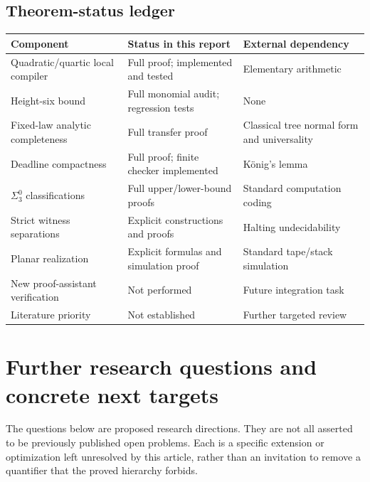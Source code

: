 \documentclass[11pt,letterpaper]{article}
\theoremstyle{definition}
\theoremstyle{remark}
\newcommand{\1}{\mathbf 1}
\begin{document}
\subsection{Theorem-status ledger}
\begin{center}
\begin{tabularx}{\textwidth}{@{}p{}XX@{}}
\toprule
Component & Status in this report & External dependency\\
\midrule
Quadratic/quartic local compiler & Full proof; implemented and tested & Elementary arithmetic\\
Height-six bound & Full monomial audit; regression tests & None\\
Fixed-law analytic completeness & Full transfer proof & Classical tree normal form and universality\\
Deadline compactness & Full proof; finite checker implemented & K\"onig's lemma\\
$\Sigma^0_3$ classifications & Full upper/lower-bound proofs & Standard computation coding\\
Strict witness separations & Explicit constructions and proofs & Halting undecidability\\
Planar realization & Explicit formulas and simulation proof & Standard tape/stack simulation\\
New proof-assistant verification & Not performed & Future integration task\\
Literature priority & Not established & Further targeted review\\
\bottomrule
\end{tabularx}
\end{center}
\section{Further research questions and concrete next targets}\label{lbh:sec:questions}\label{lbh:qd:sec:research}\label{lbh:ql:sec:future}

The questions below are proposed research directions. They are not all
asserted to be previously published open problems. Each is a specific
extension or optimization left unresolved by this article, rather than
an invitation to remove a quantifier that the proved hierarchy forbids.
\end{document}
